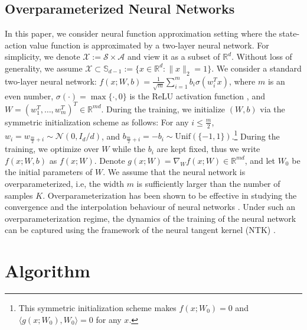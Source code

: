 \documentclass{article} \usepackage{iclr2023/iclr2023_conference,times}
\begin{document}
\vspace{-2pt}
\subsection{Overparameterized Neural Networks}
\label{subsetion: overparameterized nn}
In this paper, we consider neural function approximation setting where the state-action value function is approximated by a two-layer neural network. For simplicity, we denote $\mathcal{X} := \mathcal{S} \times \mathcal{A}$ and view it as a subset of $\mathbb{R}^d$. Without loss of generality, we assume $\mathcal{X} \subset \mathbb{S}_{d-1}:= \{x \in \mathbb{R}^d: \|x\|_2 = 1\}$. We consider a standard two-layer neural network: $f(x; W, b) = \frac{1}{\sqrt{m}}\sum_{i=1}^{m} b_i \sigma(w_i^T x)$,  
where $m$ is an even number, $\sigma(\cdot) = \max \{ \cdot,0\}$ is the ReLU activation function \citep{aroraunderstanding}, and $W = (w_1^T, \ldots, w_m^T)^T \in \mathbb{R}^{md}$. During the training, we initialize $(W,b)$ via the symmetric initialization scheme \citep{gao2019convergence} as follows: For any $i \leq \frac{m}{2}$, $ w_i = w_{\frac{m}{2} + i} \sim \mathcal{N}(0, I_d /d)$, and $b_{\frac{m}{2} + i} = - b_i \sim \textrm{Unif}(\{-1,1\})$.\footnote{This symmetric initialization scheme makes $f(x; W_0) = 0$ and $\langle g(x;W_0), W_0\rangle = 0$ for any $x$.}  
During the training, we optimize over $W$ while the $b_i$ are kept fixed, thus we write $f(x; W, b)$ as $f(x;W)$. Denote $g(x; W) = \nabla_W f(x; W) \in \mathbb{R}^ {md}$, and let $W_0$ be the initial parameters of $W$. We assume that the neural network is overparameterized, i.e, the width $m$ is sufficiently larger than the number of samples $K$. Overparameterization has been shown to be effective in studying the convergence and the interpolation behaviour of neural networks \citep{arora2019exact,allen2019convergence,hanin2019finite,cao2019generalization,belkin2021fit}. Under such an overparameterization regime, the dynamics of the training of the neural network can be captured using the framework of the neural tangent kernel (NTK) \citep{jacot2018neural}. 









 \section{Algorithm}
\end{document}
